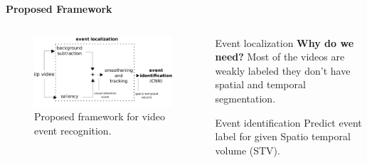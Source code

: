 \begin{frame}{\textbf{Proposed Framework}}
\begin{columns}
	\begin{column}{0.6\textwidth}
	\begin{figure}
	\begin{framed}
		\centering
		\includegraphics[width=\textwidth]{./img/outline.png}
	\end{framed}
		\caption{Proposed framework for video event recognition.}
	\end{figure}
	\end{column}
	\begin{column}{0.3\textwidth}
		\begin{varblock}[\textwidth]{Event localization}
			\textbf{Why do we need?} Most of the videos are weakly labeled they don't have spatial and temporal segmentation.
		\end{varblock}
		\begin{varblock}[\textwidth]{Event identification}
			Predict event label for given Spatio temporal volume (STV).
		\end{varblock}
	\end{column}
\end{columns}
\end{frame}

